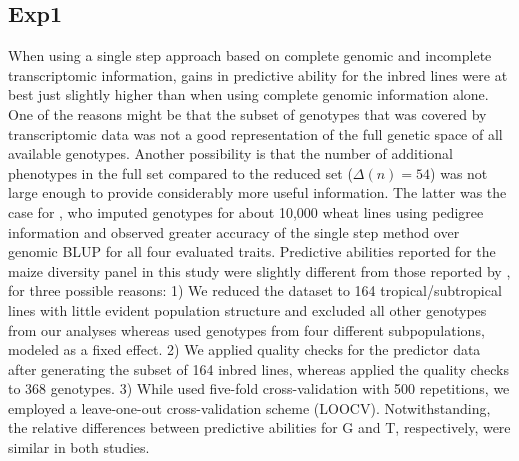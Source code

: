 \documentclass[12pt,titlepage]{article}
\begin{document}
\subsection{Exp1}
When using a single step approach based on complete genomic and incomplete
transcriptomic information, gains in predictive ability for the inbred lines
were at best just slightly higher than when using complete genomic information
alone.
One of the reasons might be that the subset of genotypes that was covered by
transcriptomic data was not a good representation of the full genetic space of
all available genotypes.
Another possibility is that the number of additional phenotypes in the full
set compared to the reduced set ($\Delta(n) = 54$) was not large enough to
provide considerably more useful information.
The latter was the case for , who imputed genotypes for about 
10,000 wheat lines using pedigree information and observed greater accuracy of
the single step method over genomic BLUP for all four evaluated traits.
Predictive abilities reported for the maize diversity panel in this study were
slightly different from those reported by , for three
possible reasons:
1) We reduced the dataset to 164 tropical/subtropical lines with little evident
population structure and excluded all other genotypes from our analyses whereas
 used genotypes from four different subpopulations, modeled as a
fixed effect.
2) We applied quality checks for the predictor data after generating the subset
of 164 inbred lines, whereas  applied the quality checks to 368
genotypes.
3) While  used five-fold cross-validation with 500 repetitions,
we employed a leave-one-out cross-validation scheme (LOOCV).
Notwithstanding, the relative differences between predictive abilities for G 
and T, respectively, were similar in both studies.
\end{document}
